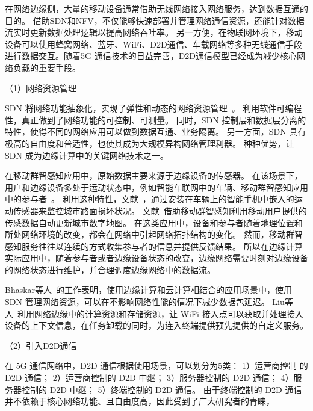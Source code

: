 在网络边缘侧，大量的移动设备通常借助无线网络接入网络服务，达到数据互通的目的。
借助SDN和NFV，不仅能够快速部署并管理网络通信资源，还能针对数据流实时更新数据处理逻辑以提高网络吞吐率。
另一方便，在物联网环境下，移动设备可以使用蜂窝网络、蓝牙、WiFi、D2D通信、车载网络等多种无线通信手段进行数据交互。随着5G 通信技术的日益完善，D2D通信模型已经成为减少核心网络负载的重要手段。

（1）网络资源管理

SDN 将网络功能抽象化，实现了弹性和动态的网络资源管理~\cite{DBLP:journals/jzusc/WangWYG18}。
利用软件可编程性，真正做到了网络功能的可控制、可测量。
同时，SDN 控制层和数据层分离的特性，使得不同的网络应用可以做到数据互通、业务隔离。
另一方面，SDN 具有极高的自由度和普适性，也使其成为大规模异构网络管理利器。
种种优势，让 SDN 成为边缘计算中的关键网络技术之一。

在移动群智感知应用中，原始数据主要来源于边缘设备的传感器。
在该场景下，用户和边缘设备多处于运动状态中，例如智能车联网中的车辆、移动群智感知应用中的参与者~\cite{DBLP:journals/jsac/LyuNTLWGP17}。
利用这种特性，文献~\cite{DBLP:conf/itsc/PiaoA17}，通过安装在车辆上的智能手机中嵌入的运动传感器来监控城市路面损坏状况。
文献~\cite{DBLP:journals/tase/PengGXGY18}借助移动群智感知利用移动用户提供的传感数据自动更新城市数字地图。
在这类应用中，设备和参与者随着地理位置和所处网络环境的改变，都会在网络中引起网络拓扑结构的变化。
然而，移动群智感知服务往往以连续的方式收集参与者的信息并提供反馈结果。
所以在边缘计算实际应用中，随着参与者或者边缘设备状态的改变，边缘网络需要时刻对边缘设备的网络状态进行维护，并合理调度边缘网络中的数据流。

Bhaskar等人~\cite{DBLP:conf/infocom/RimalVM16}的工作表明，使用边缘计算和云计算相结合的应用场景中，使用 SDN 管理网络资源，可以在不影响网络性能的情况下减少数据包延迟。
Liu等人~\cite{DBLP:conf/edge/LiuWB16}利用网络边缘中的计算资源和存储资源，让 WiFi 接入点可以获取并处理接入设备的上下文信息，在任务卸载的同时，为连入终端提供预先提供的自定义服务。



（2）引入D2D通信

在 5G 通信网络中，D2D 通信根据使用场景，可以划分为5类：
1）运营商控制 的 D2D 通信；%
2）运营商控制的 D2D 中继；%
3）服务器控制的 D2D 通信；%
4）服务器控制的 D2D 中继；%
5）终端控制的 D2D 通信。%
由于终端控制的 D2D 通信并不依赖于核心网络功能、且自由度高，因此受到了广大研究者的青睐，

